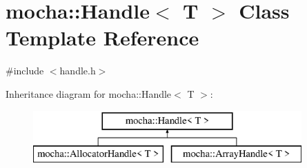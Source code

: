 \hypertarget{classmocha_1_1_handle}{
\section{mocha::Handle$<$ T $>$ Class Template Reference}
\label{classmocha_1_1_handle}
}


{\ttfamily \#include $<$handle.h$>$}

Inheritance diagram for mocha::Handle$<$ T $>$:\begin{figure}[H]
\begin{center}
\leavevmode
\includegraphics[height=2.000000cm]{classmocha_1_1_handle}
\end{center}
\end{figure}
